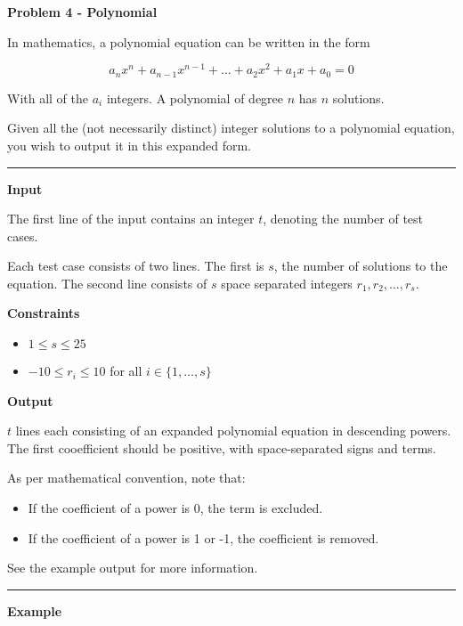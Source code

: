 \LARGE \textbf{Problem 4 - Polynomial} \normalsize

In mathematics, a polynomial equation can be written in the form

\begin{equation*}
    a_n x^n + a_{n-1} x^{n-1} + \dots + a_2 x^2 + a_1 x + a_0 = 0
\end{equation*}

With all of the $a_i$ integers. A polynomial of degree $n$ has $n$ solutions.

Given all the (not necessarily distinct) integer solutions to a polynomial equation, you wish to output it in this expanded form.

\vspace{8pt}
\hrule

\textbf{Input}

The first line of the input contains an integer $t$, denoting the number of test cases.

Each test case consists of two lines. The first is $s$, the number of solutions to the equation. 
The second line consists of $s$ space separated integers $r_1, r_2, \dots, r_s$.

\textbf{Constraints}

\begin{itemize}
    \item $1 \leq s \leq 25$
    \item $-10 \leq r_i \leq 10$ for all $i \in \{ 1, \dots, s\}$
\end{itemize}

\textbf{Output}

$t$ lines each consisting of an expanded polynomial equation in descending powers. 
The first cooefficient should be positive, with space-separated signs and terms.

As per mathematical convention, note that:

\begin{itemize}
    \item If the coefficient of a power is 0, the term is excluded.
    \item If the coefficient of a power is 1 or -1, the coefficient is removed.
\end{itemize}

See the example output for more information.

\vspace{8pt}
\hrule

\textbf{Example}

